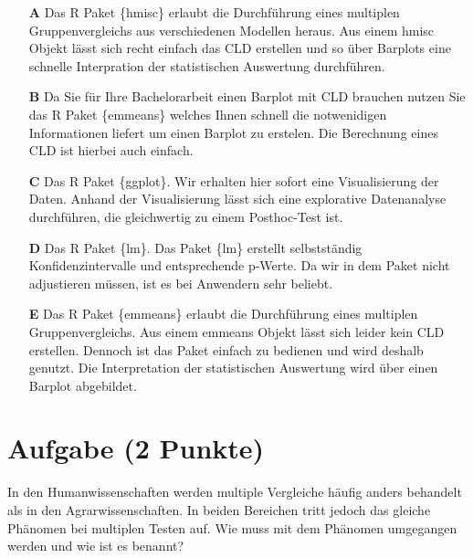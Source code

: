 \documentclass[a4paper, 9pt]{scrartcl}\usepackage[]{graphicx}\usepackage[]{xcolor}
\begin{document}
\begin{enumerate}
\item [\textbf{A} \msquare] Das R Paket \{hmisc\} erlaubt die Durchführung eines multiplen Gruppenvergleichs aus verschiedenen Modellen heraus. Aus einem hmisc Objekt lässt sich recht einfach das CLD erstellen und so über Barplots eine schnelle Interpration der statistischen Auswertung durchführen.
\item [\textbf{B} \msquare] Da Sie für Ihre Bachelorarbeit einen Barplot mit CLD brauchen nutzen Sie das R Paket \{emmeans\} welches Ihnen schnell die notwenidigen Informationen liefert um einen Barplot zu erstelen. Die Berechnung eines CLD ist hierbei auch einfach.
\item [\textbf{C} \msquare] Das R Paket \{ggplot\}. Wir erhalten hier sofort eine Visualisierung der Daten. Anhand der Visualisierung lässt sich eine explorative Datenanalyse durchführen, die gleichwertig zu einem Posthoc-Test ist.
\item [\textbf{D} \msquare] Das R Paket \{lm\}. Das Paket \{lm\} erstellt selbstständig Konfidenzintervalle und entsprechende p-Werte. Da wir in dem Paket nicht adjustieren müssen, ist es bei Anwendern sehr beliebt.
\item [\textbf{E} \msquare] Das R Paket \{emmeans\} erlaubt die Durchführung eines multiplen Gruppenvergleichs. Aus einem emmeans Objekt lässt sich leider kein CLD erstellen. Dennoch ist das Paket einfach zu bedienen und wird deshalb genutzt. Die Interpretation der statistischen Auswertung wird über einen Barplot abgebildet.
\end{enumerate}

\section{Aufgabe \hfill (2 Punkte)}



In den Humanwissenschaften werden multiple Vergleiche häufig anders behandelt als in den Agrarwissenschaften. In beiden Bereichen tritt jedoch das gleiche Phänomen bei multiplen Testen auf. Wie muss mit dem Phänomen umgegangen werden und wie ist es benannt?
\end{document}
